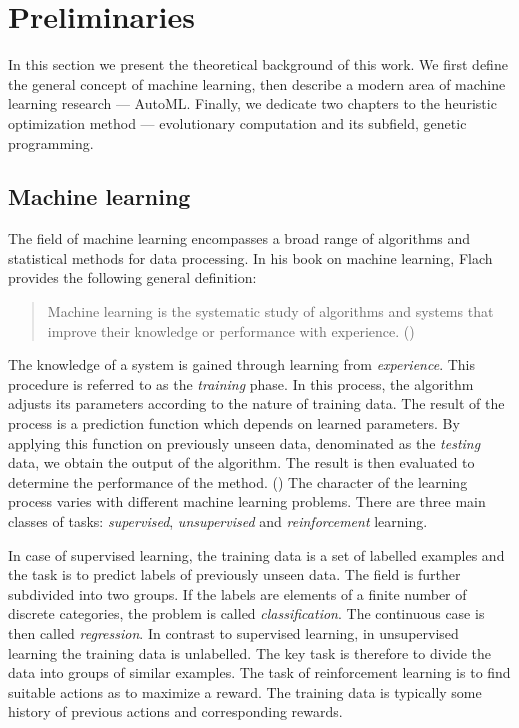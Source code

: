 \chapter{Preliminaries}

In this section we present the theoretical background of this work. We first
define the general concept of machine learning, then describe a modern area
of machine learning research --- AutoML. Finally, we dedicate two chapters to
the heuristic optimization method --- evolutionary computation and its subfield,
genetic programming.

\section{Machine learning}
The field of machine learning encompasses a broad range of algorithms and
statistical methods for data processing. In his book on machine learning,
Flach provides the following general definition:

\blockquote{Machine learning is the systematic study of algorithms and systems
that improve their knowledge or performance with experience.
(\cite{Flach:2012:MLA:2490546})} %

The knowledge of a system is gained through learning from \emph{experience}.
This procedure is referred to as the \emph{training} phase. In this process, 
the algorithm adjusts its parameters according to the nature of training data.
The result of the process is a prediction function which depends on learned
parameters. By applying this function on previously unseen data, denominated 
as the \emph{testing} data, we obtain the output of the algorithm. The 
result is then evaluated to determine the performance of the method. 
(\cite{Bishop:2006:PRM:1162264}) The character of the learning process
varies with different machine learning problems. There are three main classes 
of tasks: \emph{supervised}, \emph{unsupervised} and \emph{reinforcement} 
learning.

In case of supervised learning, the training data is a set of labelled examples
and the task is to predict labels of previously unseen data. The field is 
further subdivided into two groups. If the labels are elements of a finite 
number of discrete categories, the problem is called \emph{classification}. 
The continuous case is then called \emph{regression}.
In contrast to supervised learning, in unsupervised learning the training data 
is unlabelled. The key task is therefore to divide the data into groups of 
similar examples. The task of reinforcement learning is to find suitable actions as to maximize 
a reward. The training data is typically some history of previous actions 
and corresponding rewards.

